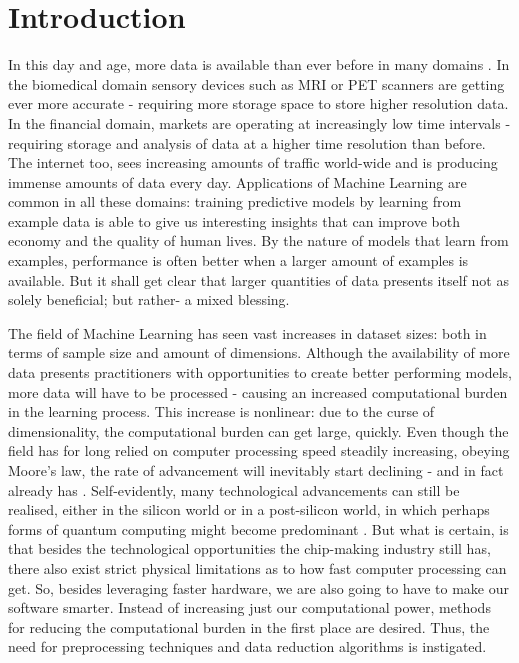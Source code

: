 \documentclass[../main.tex]{subfiles}
\begin{document}
\section{Introduction}\label{section:introduction}

In this day and age, more data is available than ever before in many domains \citep{sagiroglu_big_2013}. In the biomedical domain sensory devices such as MRI or PET scanners are getting ever more accurate - requiring more storage space to store higher resolution data. In the financial domain, markets are operating at increasingly low time intervals - requiring storage and analysis of data at a higher time resolution than before. The internet too, sees increasing amounts of traffic world-wide and is producing immense amounts of data every day. Applications of Machine Learning are common in all these domains: training predictive models by learning from example data is able to give us interesting insights that can improve both economy and the quality of human lives. By the nature of models that learn from examples, performance is often better when a larger amount of examples is available. But it shall get clear that larger quantities of data presents itself not as solely beneficial; but rather- a mixed blessing.



The field of Machine Learning has seen vast increases in dataset sizes: both in terms of sample size and amount of dimensions. Although the availability of more data presents practitioners with opportunities to create better performing models, more data will have to be processed - causing an increased computational burden in the learning process. This increase is nonlinear: due to the curse of dimensionality, the computational burden can get large, quickly. Even though the field has for long relied on computer processing speed steadily increasing, obeying Moore's law, the rate of advancement will inevitably start declining - and in fact already has \citep{theis_end_2017}. Self-evidently, many technological advancements can still be realised, either in the silicon world or in a post-silicon world, in which perhaps forms of quantum computing might become predominant \citep{britt_high-performance_2017}. But what is certain, is that besides the technological opportunities the chip-making industry still has, there also exist strict physical limitations as to how fast computer processing can get. So, besides leveraging faster hardware, we are also going to have to make our software smarter. Instead of increasing just our computational power, methods for reducing the computational burden in the first place are desired. Thus, the need for preprocessing techniques and data reduction algorithms is instigated.
\end{document}

